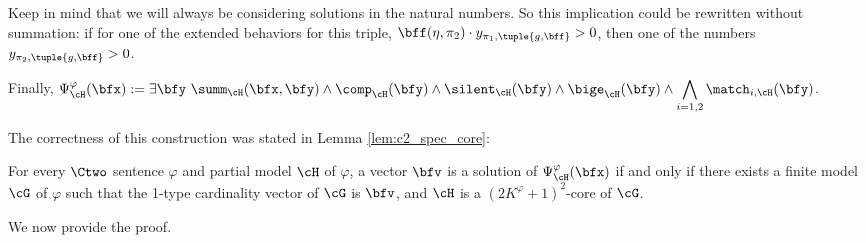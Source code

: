 \begin{compactitem}
        Keep in mind that we will always be considering solutions in the natural numbers. So this implication could be rewritten without summation: if for one of the extended behaviors for this triple, $\bff(\eta, \pi_2) \cdot y_{\pi_1, \tuple{g, \bff}} > 0$, then  one of the numbers $y_{\pi_2, \tuple{g, \bff}} > 0$.
\end{compactitem}
    Finally, $\displaystyle
        \Psi^\varphi_{\cH}(\bfx)
             :=
             \exists \bfy\ 
            \summ_{\cH}(\bfx, \bfy) \land
            \comp_{\cH}(\bfy) \land
            \silent_{\cH}(\bfy) \land
            \bige_{\cH}(\bfy) \land
            \bigwedge_{i=1, 2}
            \match_{i, \cH}(\bfy)$.
            
The correctness of this construction was stated in Lemma \ref{lem:c2_spec_core}:

\medskip

    For every $\Ctwo$ sentence $\varphi$ and partial model $\cH$ of $\varphi$,
    a vector $\bfv$ is a solution of $\Psi^\varphi_\cH(\bfx)$
    if and only if
    there exists a finite model $\cG$ of $\varphi$ such that
    the 1-type cardinality vector of $\cG$ is $\bfv$,
    and $\cH$ is a $(2K^\varphi+1)^2$-core of $\cG$.

\medskip

We now provide the proof.

